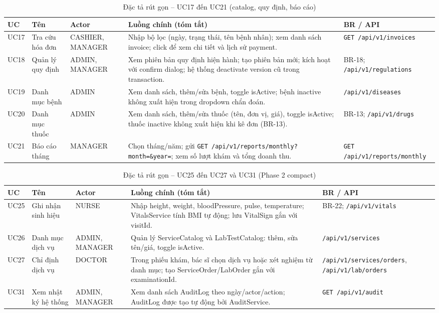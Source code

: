 \begin{table}[H]
\centering
\caption{Đặc tả rút gọn -- UC17 đến UC21 (catalog, quy định, báo cáo)}
\label{tab:uc-simple-p1b}
\begin{tabularx}{\textwidth}{|p{1.3cm}|p{2.5cm}|p{2.4cm}|X|p{2.3cm}|}
\hline
\textbf{UC} & \textbf{Tên} & \textbf{Actor} & \textbf{Luồng chính (tóm tắt)} & \textbf{BR / API} \\
\hline
UC17 & Tra cứu hóa đơn & CASHIER, MANAGER & Nhập bộ lọc (ngày, trạng thái, tên bệnh nhân); xem danh sách invoice; click để xem chi tiết và lịch sử payment. & \texttt{GET /api/v1/invoices} \\
\hline
UC18 & Quản lý quy định & ADMIN, MANAGER & Xem phiên bản quy định hiện hành; tạo phiên bản mới; kích hoạt với confirm dialog; hệ thống deactivate version cũ trong transaction. & BR-18; \texttt{/api/v1/regulations} \\
\hline
UC19 & Danh mục bệnh & ADMIN & Xem danh sách, thêm/sửa bệnh, toggle isActive; bệnh inactive không xuất hiện trong dropdown chẩn đoán. & \texttt{/api/v1/diseases} \\
\hline
UC20 & Danh mục thuốc & ADMIN & Xem danh sách, thêm/sửa thuốc (tên, đơn vị, giá), toggle isActive; thuốc inactive không xuất hiện khi kê đơn (BR-13). & BR-13; \texttt{/api/v1/drugs} \\
\hline
UC21 & Báo cáo tháng & MANAGER & Chọn tháng/năm; gửi \texttt{GET /api/v1/reports/monthly?month=\&year=}; xem số lượt khám và tổng doanh thu. & \texttt{GET /api/v1/reports/monthly} \\
\hline
\end{tabularx}
\end{table}

\begin{table}[H]
\centering
\caption{Đặc tả rút gọn -- UC25 đến UC27 và UC31 (Phase 2 compact)}
\label{tab:uc-simple-p2}
\begin{tabularx}{\textwidth}{|p{1.3cm}|p{2.5cm}|p{2.4cm}|X|p{2.3cm}|}
\hline
\textbf{UC} & \textbf{Tên} & \textbf{Actor} & \textbf{Luồng chính (tóm tắt)} & \textbf{BR / API} \\
\hline
UC25 & Ghi nhận sinh hiệu & NURSE & Nhập height, weight, bloodPressure, pulse, temperature; VitalsService tính BMI tự động; lưu VitalSign gắn với visitId. & BR-22; \texttt{/api/v1/vitals} \\
\hline
UC26 & Danh mục dịch vụ & ADMIN, MANAGER & Quản lý ServiceCatalog và LabTestCatalog: thêm, sửa tên/giá, toggle isActive. & \texttt{/api/v1/services} \\
\hline
UC27 & Chỉ định dịch vụ & DOCTOR & Trong phiếu khám, bác sĩ chọn dịch vụ hoặc xét nghiệm từ danh mục; tạo ServiceOrder/LabOrder gắn với examinationId. & \texttt{/api/v1/services/orders}, \texttt{/api/v1/lab/orders} \\
\hline
UC31 & Xem nhật ký hệ thống & ADMIN, MANAGER & Xem danh sách AuditLog theo ngày/actor/action; AuditLog được tạo tự động bởi AuditService. & \texttt{GET /api/v1/audit} \\
\hline
\end{tabularx}
\end{table}

